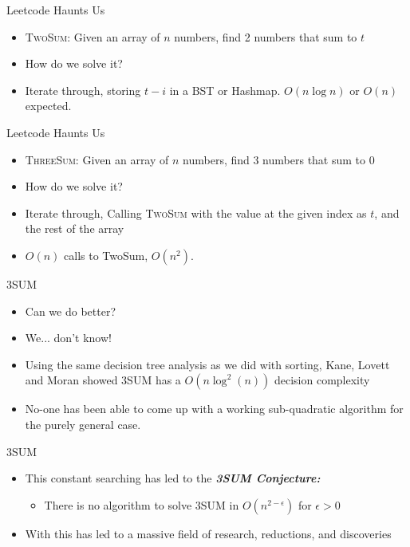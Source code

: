\documentclass[aspectratio=169]{beamer}
\begin{document}
\begin{frame}{Leetcode Haunts Us}
    \begin{itemize}
        \item \textsc{TwoSum}: Given an array of $n$ numbers, find 2 numbers that sum to $t$ \pause 
        \item How do we solve it? \pause
        \item Iterate through, storing $t-i$ in a BST or Hashmap. $O(n \log n)$ or $O(n)$ expected.
    \end{itemize}
\end{frame}

\begin{frame}{Leetcode Haunts Us}
    \begin{itemize}
        \item \textsc{ThreeSum}: Given an array of $n$ numbers, find 3 numbers that sum to $0$ \pause 
        \item How do we solve it? \pause
        \item Iterate through, Calling \textsc{TwoSum} with the value at the given index as $t$, and the rest of the array \pause
        \item $O(n)$ calls to TwoSum, $O(n^2)$.
    \end{itemize}
\end{frame}

\begin{frame}{3SUM}
    \begin{itemize}
        \item Can we do better? \pause
        \item We... don't know! \pause 
        \item Using the same decision tree analysis as we did with sorting, Kane, Lovett and Moran showed \textsc{3SUM} has a $O(n\log^2(n))$ decision complexity \pause 
        \item No-one has been able to come up with a working sub-quadratic algorithm for the purely general case.
    \end{itemize}    
\end{frame}

\begin{frame}{3SUM}
\begin{itemize}

    \item This constant searching has led to the \textbf{\textit{3SUM Conjecture:}}
    \begin{itemize}
        \item There is no algorithm to solve \textsc{3SUM} in $O(n^{2-\epsilon})$ for $\epsilon > 0$ \pause
    \end{itemize}
    \item With this has led to a massive field of research, reductions, and discoveries
\end{itemize}    
\end{frame}
\end{document}
